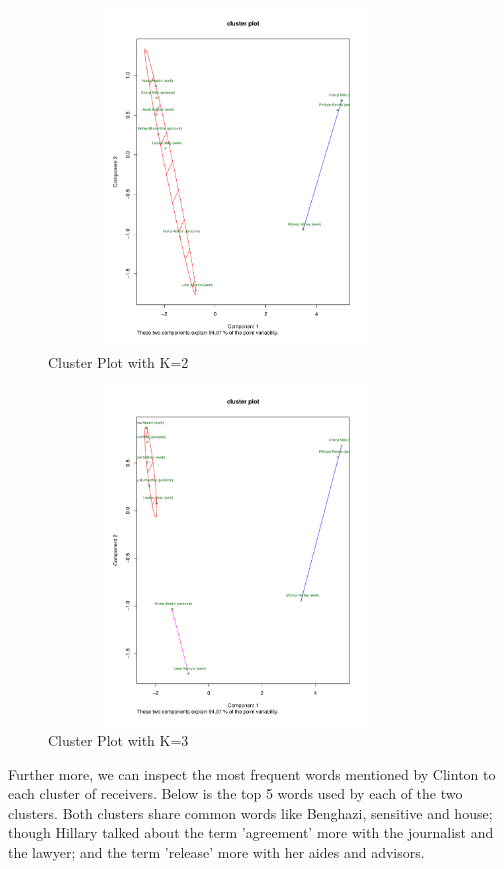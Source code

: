 \documentclass[11pt,a4paper]{article}
\begin{document}
\begin{figure}[h!]
    \centering
    \includegraphics[width=10cm,height=9cm]
    {c2.pdf}
    \caption{Cluster Plot with K=2}
\end{figure}

\begin{figure}[h!]
    \centering
    \includegraphics[width=10cm,height=9cm]
    {c3.pdf}
    \caption{Cluster Plot with K=3}
\end{figure}

\newpage
Further more, we can inspect the most frequent words mentioned by Clinton to each cluster of receivers. Below is the top 5 words used by each of the two clusters. Both clusters share common words like Benghazi, sensitive and house; though Hillary talked about the term 'agreement' more with the journalist and the lawyer; and the term 'release' more with her aides and advisors. 
\\
\end{document}
